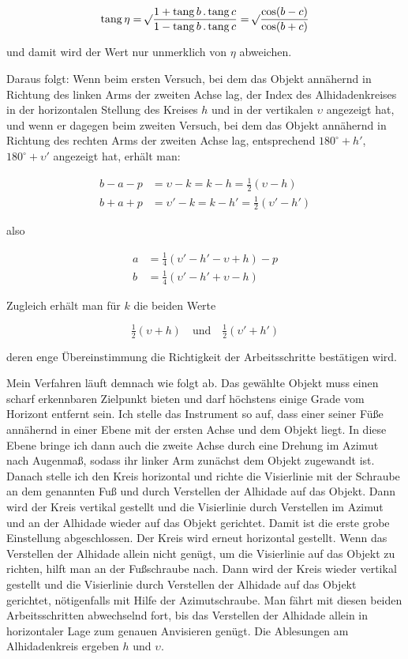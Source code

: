 \[ \mathrm{tang}\,\eta = \mathord{{}^{}\!\surd}\dfrac{1+\mathrm{tang}\,b\,.\,\mathrm{tang}\,c}{1-\mathrm{tang}\,b\,.\,\mathrm{tang}\,c} = \mathord{{}^{}\!\surd}\dfrac{\cos(b-c)}{\cos(b+c)} \]

\noindent und damit wird der Wert nur unmerklich von $\eta$ abweichen.

\par\indent Daraus folgt: Wenn beim ersten Versuch, bei dem das Objekt annähernd in Richtung des linken Arms der zweiten Achse lag, der Index des Alhidadenkreises in der horizontalen Stellung des Kreises $h$ und in der vertikalen $\upsilon$ angezeigt hat, und wenn er dagegen beim zweiten Versuch, bei dem das Objekt annähernd in Richtung des rechten Arms der zweiten Achse lag, entsprechend $180^\circ+h'$, $180^\circ+\upsilon'$ angezeigt hat, erhält man:

\[ \begin{aligned} b-a-p &= \upsilon-k = k-h = \tfrac{1}{2}(\upsilon-h) \\ b+a+p &= \upsilon'-k = k-h' = \tfrac{1}{2}(\upsilon'-h') \end{aligned} \]

\noindent also

\[ \begin{aligned} a &= \tfrac{1}{4}(\upsilon'-h'-\upsilon+h)-p \\ b &= \tfrac{1}{4}(\upsilon'-h'+\upsilon-h) \end{aligned} \]

\noindent Zugleich erhält man für $k$ die beiden Werte

\[ \tfrac{1}{2}(\upsilon+h) \quad\text{und}\quad \tfrac{1}{2}(\upsilon'+h') \]

\noindent deren enge Übereinstimmung die Richtigkeit der Arbeitsschritte bestätigen wird.

\par\indent Mein Verfahren läuft demnach wie folgt ab. Das gewählte Objekt muss einen scharf erkennbaren Zielpunkt bieten und darf höchstens einige Grade vom Horizont entfernt sein. Ich stelle das Instrument so auf, dass einer seiner Füße annähernd in einer Ebene mit der ersten Achse und dem Objekt liegt. In diese Ebene bringe ich dann auch die zweite Achse durch eine Drehung im Azimut nach Augenmaß, sodass ihr linker Arm zunächst dem Objekt zugewandt ist. Danach stelle ich den Kreis horizontal und richte die Visierlinie mit der Schraube an dem genannten Fuß und durch Verstellen der Alhidade auf das Objekt. Dann wird der Kreis vertikal gestellt und die Visierlinie durch Verstellen im Azimut und an der Alhidade wieder auf das Objekt gerichtet. Damit ist die erste grobe Einstellung abgeschlossen. Der Kreis wird erneut horizontal gestellt. Wenn das Verstellen der Alhidade allein nicht genügt, um die Visierlinie auf das Objekt zu richten, hilft man an der Fußschraube nach. Dann wird der Kreis wieder vertikal gestellt und die Visierlinie durch Verstellen der Alhidade auf das Objekt gerichtet, nötigenfalls mit Hilfe der Azimutschraube. Man fährt mit diesen beiden Arbeitsschritten abwechselnd fort, bis das Verstellen der Alhidade allein in horizontaler Lage zum genauen Anvisieren genügt. Die Ablesungen am Alhidadenkreis ergeben $h$ und $\upsilon$.

